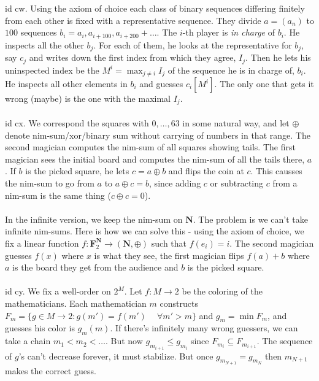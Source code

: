 \documentclass[oneside]{book}
\newcommand{\sub}{\subseteq}
\newcommand{\F}{\mathbf{F}}
\newcommand{\N}{\mathbf{N}}
\newcommand{\set}[1]{\{ #1\}}
\newcommand{\spc}{\phantom{-}}
\begin{document}
id cw. Using the axiom of choice each class of binary sequences differing finitely from each other is fixed with a representative sequence. They divide $a=(a_n)$ to $100$ sequences $b_i=a_{i},a_{i+100},a_{i+200}+\dots$. The $i$-th player is {\it in charge} of $b_i$. He inspects all the other $b_j$. For each of them, he looks at the representative for $b_j$, say $c_j$ and writes down the first index from which they agree, $I_j$. Then he lets his uninspected index be the $M^{i}=\max_{j\neq i}I_j$ of the sequence he is in charge of, $b_i$. He inspects all other elements in $b_i$ and guesses $c_i[M^{i}]$. The only one that gets it wrong (maybe) is the one with the maximal $I_j$.\\\\


id cx. We correspond the squares with $0,\dots,63$ in some natural way, and let $\oplus$ denote nim-sum/xor/binary sum without carrying of numbers in that range. The second magician computes the nim-sum of all squares showing tails. The first magician sees the initial board and computes the nim-sum of all the tails there, $a$. If $b$ is the picked square, he lets $c=a\oplus b$ and flips the coin at $c$. This causses the nim-sum to go from $a$ to $a\oplus c=b$, since adding $c$ or subtracting $c$ from a nim-sum is the same thing ($c\oplus c=0$).\\\\
In the infinite version, we keep the nim-sum on $\N$. The problem is we can't take infinite nim-sums. Here is how we can solve this - using the axiom of choice, we fix a linear function $f:\F_2^\N \to (\N,\oplus)$ such that $f(e_i)=i$. The second magician guesses $f(x)$ where $x$ is what they see, the first magician flips $f(a)+b$ where $a$ is the board they get from the audience and $b$ is the picked square.\\\\


id cy. We fix a well-order on $2^M$. Let $f:M\to2$ be the coloring of the mathematicians. Each mathematician $m$ constructs $F_m=\set{g\in M\to 2: g(m')=f(m') \spc\forall m'>m}$ and $g_m=\min F_m$, and guesses his color is $g_m(m)$. If there's infinitely many wrong guessers, we can take a chain $m_1<m_2<\dots$. But now $g_{m_{i+1}}\le g_{m_i}$ since $F_{m_i}\sub F_{m_{i+1}}$. The sequence of $g$'s can't decrease forever, it must stabilize. But once $g_{m_{N+1}}=g_{m_N}$ then $m_{N+1}$ makes the correct guess.\\\\
\end{document}
